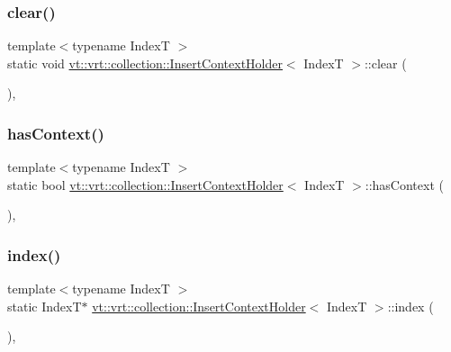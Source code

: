 \subsubsection{\texorpdfstring{clear()}{clear()}}
{\footnotesize\ttfamily template$<$typename IndexT $>$ \\
static void \hyperlink{structvt_1_1vrt_1_1collection_1_1_insert_context_holder}{vt\+::vrt\+::collection\+::\+Insert\+Context\+Holder}$<$ IndexT $>$\+::clear (\begin{DoxyParamCaption}{ }\end{DoxyParamCaption})\hspace{0.3cm}{\ttfamily [inline]}, {\ttfamily [static]}}

\mbox{\label{structvt_1_1vrt_1_1collection_1_1_insert_context_holder_a5b08452039d70ebb5cef640bfeb5c2ee}} 
\subsubsection{\texorpdfstring{has\+Context()}{hasContext()}}
{\footnotesize\ttfamily template$<$typename IndexT $>$ \\
static bool \hyperlink{structvt_1_1vrt_1_1collection_1_1_insert_context_holder}{vt\+::vrt\+::collection\+::\+Insert\+Context\+Holder}$<$ IndexT $>$\+::has\+Context (\begin{DoxyParamCaption}{ }\end{DoxyParamCaption})\hspace{0.3cm}{\ttfamily [inline]}, {\ttfamily [static]}}

\mbox{\label{structvt_1_1vrt_1_1collection_1_1_insert_context_holder_aba5840488b51c1274ca0f6fb4b6bc0f7}} 
\subsubsection{\texorpdfstring{index()}{index()}}
{\footnotesize\ttfamily template$<$typename IndexT $>$ \\
static IndexT$\ast$ \hyperlink{structvt_1_1vrt_1_1collection_1_1_insert_context_holder}{vt\+::vrt\+::collection\+::\+Insert\+Context\+Holder}$<$ IndexT $>$\+::index (\begin{DoxyParamCaption}{ }\end{DoxyParamCaption})\hspace{0.3cm}{\ttfamily [inline]}, {\ttfamily [static]}}

